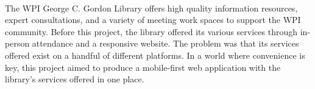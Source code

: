 \paragraph{}
The WPI George C. Gordon Library offers high quality information resources, expert consultations, and a variety of meeting work spaces to support the WPI community. Before this project, the library offered its various services through in-person attendance and a responsive website. The problem was that its services offered exist on a handful of different platforms. In a world where convenience is key, this project aimed to produce a mobile-first web application with the library's services offered in one place.
